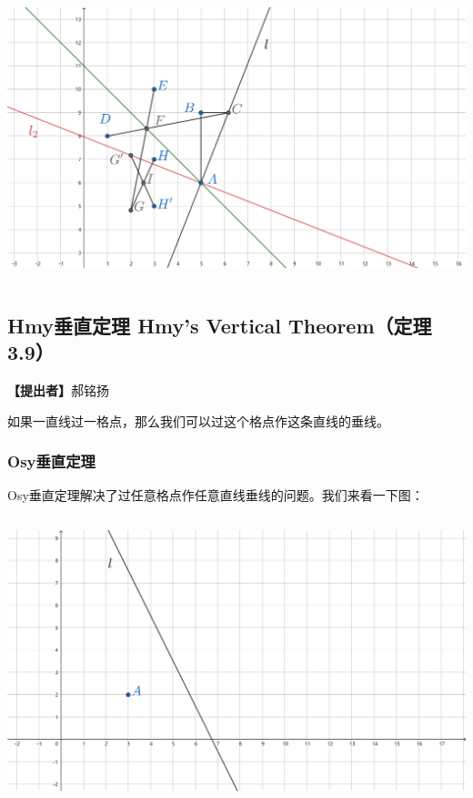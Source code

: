 \documentclass[UTF8]{article}
\begin{document}
\includegraphics[width=5.76806in,height=3.27847in]{media/image47.png}

\hypertarget{hmyux5782ux76f4ux5b9aux7406-hmys-vertical-theoremux5b9aux7406-3.9}{%
\subsection{Hmy垂直定理 Hmy's Vertical Theorem（定理
3.9）}\label{hmyux5782ux76f4ux5b9aux7406-hmys-vertical-theoremux5b9aux7406-3.9}}

\textbf{【提出者】}郝铭扬

如果一直线过一格点，那么我们可以过这个格点作这条直线的垂线。

\hypertarget{osyux5782ux76f4ux5b9aux7406}{%
\subsubsection{Osy垂直定理}\label{osyux5782ux76f4ux5b9aux7406}}

Osy垂直定理解决了过任意格点作任意直线垂线的问题。我们来看一下图：

\includegraphics[width=5.76806in,height=3.27847in]{media/image48.png}
\end{document}
